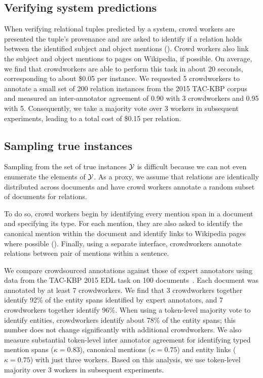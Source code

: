 \subsection{Verifying system predictions}
When verifying relational tuples predicted by a system, 
  crowd workers are presented the tuple's provenance and are asked to identify if a relation holds between the identified subject and object mentions (). 
  Crowd workers also link the subject and object mentions to pages on Wikipedia, if possible.
On average, we find that crowdworkers are able to perform this task in about 20 seconds, corresponding to about \$0.05 per instance.
We requested 5 crowdworkers to annotate a small set of 200 relation instances from the 2015 TAC-KBP corpus 
and measured an inter-annotator agreement of 0.90 with 3 crowdworkers and 0.95 with 5.
Consequently, we take a majority vote over 3 workers in subsequent experiments, leading to a total cost of \$0.15 per relation.

\subsection{Sampling true instances}
Sampling from the set of true instances $\mathcal{Y}$ is difficult because we can not even enumerate the elements of $\mathcal{Y}$.
As a proxy, we assume that relations are identically distributed across documents and have crowd workers annotate a random subset of documents for relations.

To do so, crowd workers begin by identifying every mention span in a document and specifying its type.
  For each mention, they are also asked to identify the canonical mention within the document
  and identify links to Wikipedia pages where possible ().
Finally, using a separate interface, crowdworkers annotate relations between pair of mentions within a sentence.

We compare crowdsourced annotations against those of expert annotators using data from the TAC-KBP 2015 EDL task on 100 documents~\citep{}.
Each document was annotated by at least 7 crowdworkers.
We find that 3 crowdworkers together identify 92\% of the entity spans identified by expert annotators,
  and 7 crowdworkers together identify 96\%.
When using a token-level majority vote to identify entities, crowdworkers identify about 78\% of the entity spans; this number does not change significantly with additional crowdworkers.
We also measure substantial token-level inter annotator agreement for identifying typed mention spans ($\kappa = 0.83$), canonical mentions ($\kappa = 0.75$) and entity links ($\kappa = 0.75$) with just three workers.
Based on this analysis, we use token-level majority over 3 workers in subsequent experiments.

